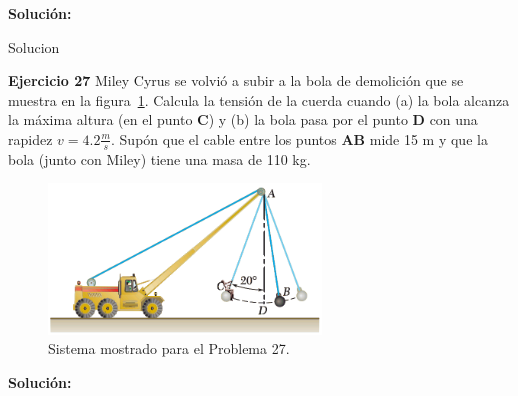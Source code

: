 \documentclass[a4paper,11pt]{scrartcl}
\begin{document}
\textbf{Solución:}

\begin{center}

Solucion

\end{center}

\textbf{Ejercicio 27} Miley Cyrus se volvió a subir a la bola de demolición que se muestra en la figura~\ref{fig:27_1}. Calcula la tensión de la cuerda cuando (a) la bola alcanza la máxima altura (en el punto \textbf{C}) y (b) la bola pasa por el punto \textbf{D} con una rapidez $ v = 4.2 \frac{m}{s}$. Supón que el cable entre los puntos \textbf{AB} mide 15
m y que la bola (junto con Miley) tiene una masa de 110 kg. \\

\begin{figure}[H]
  \centering
  \includegraphics[height=4cm]{27_1}
  \caption{Sistema mostrado para el Problema 27.}
  \label{fig:27_1}
\end{figure}

\textbf{Solución:}
\end{document}
